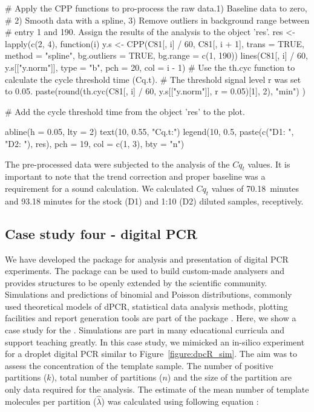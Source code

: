 \begin{example}
  # Apply the CPP functions to pro-process the raw data.1) Baseline data to 
zero, 
  # 2) Smooth data with a spline, 3) Remove outliers in background range 
between 
  # entry 1 and 190. Assign the results of the analysis to the object 'res'.
res <- lapply(c(2, 4), function(i) {
  y.s <- CPP(C81[, i] / 60, C81[, i + 1],
             trans = TRUE, 
             method = "spline",
             bg.outliers = TRUE,
             bg.range = c(1, 190))
  lines(C81[, i] / 60, y.s[["y.norm"]], type = "b", pch = 20, col = i - 1)
  # Use the th.cyc function to calculate the cycle threshold time (Cq.t). 
  # The threshold signal level r was set to 0.05.
  paste(round(th.cyc(C81[, i] / 60, y.s[["y.norm"]], r = 0.05)[1], 2), "min")
})

# Add the cycle threshold time from the object 'res' to the plot.

abline(h = 0.05, lty = 2)
text(10, 0.55, "Cq.t:")
legend(10, 0.5, paste(c("D1: ", "D2: "), res), pch = 19, col = c(1, 3), 
       bty = "n")
\end{example}

The pre-processed data were subjected to the analysis of the $Cq_{t}$ values. 
It 
is important to note that the trend correction and proper baseline was a 
requirement for a sound calculation. We calculated $Cq_{t}$ 
values of 70.18~minutes and 93.18 minutes for the stock (D1) and 1:10 (D2) 
diluted samples, receptively.

\subsection{Case study four - digital PCR}

We have developed the  package for analysis and presentation of 
digital PCR experiments. The  package can be used to build 
custom-made analysers and provides structures to be openly extended by the 
scientific community. Simulations and predictions of binomial and Poisson 
distributions, commonly used theoretical models of dPCR, statistical data 
analysis methods, plotting facilities and report generation tools are part of 
the package \citep{pabinger_2014}. Here, we show a case study for the 
. Simulations are part in many educational curricula and support 
teaching greatly. In this case study, we mimicked an in-silico experiment for a 
droplet digital PCR similar to Figure~\ref{figure:dpcR_sim}. The aim was to 
assess the concentration of the template sample. The number of positive 
partitions ($k$), total number of partitions ($n$) and the size of the 
partition 
are only data required for the analysis. The estimate of the mean number of 
template molecules per partition ($\hat \lambda$) was calculated using 
following 
equation \citep{huggett_2013}:

